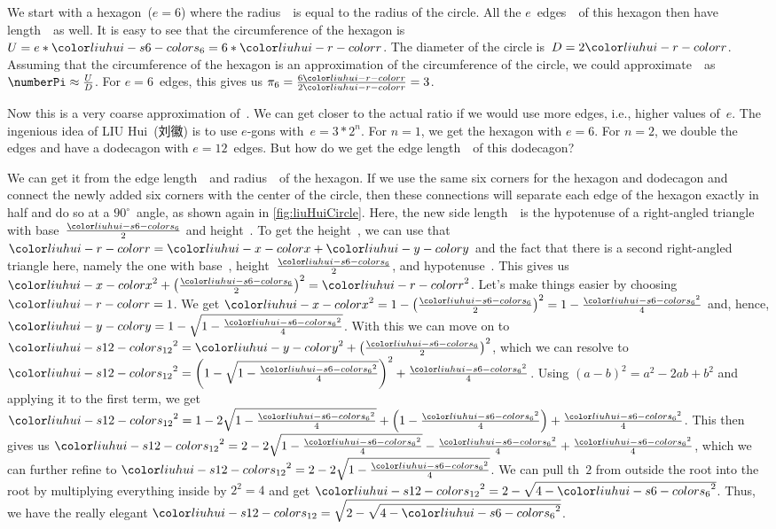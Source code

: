 We start with a hexagon~($e=6$) where the radius~\liuhuir\ is equal to the radius of the circle.
All the $e$~edges~\liuhuiss\ of this hexagon then have length~\liuhuir\ as well.
It is easy to see that the circumference of the hexagon is~$U=e*\liuhuiss=6*\liuhuir$.
The diameter of the circle is~$D=2\liuhuir$.
Assuming that the circumference of the hexagon is an approximation of the circumference of the circle, we could approximate~\numberPi\ as $\numberPi\approx\frac{U}{D}$.
For $e=6$~edges, this gives us $\pi_6=\frac{6\liuhuir}{2\liuhuir}=3$.

Now this is a very coarse approximation of~\numberPi.
We can get closer to the actual ratio if we would use more edges, i.e., higher values of~$e$.
The ingenious idea of LIU Hui~(刘徽) is to use $e$\nobreakdashes-gons with~$e=3*2^n$.
For $n=1$, we get the hexagon with $e=6$.
For $n=2$, we double the edges and have a dodecagon with $e=12$~edges.
But how do we get the edge length~\liuhuist\ of this dodecagon?

We can get it from the edge length~\liuhuiss\ and radius~\liuhuir\ of the hexagon.
If we use the same six corners for the hexagon and dodecagon and connect the newly added six corners with the center of the circle, then these connections will separate each edge of the hexagon exactly in half and do so at a $90^\circ$~angle, as shown again in \cref{fig:liuHuiCircle}.
Here, the new side length~\liuhuist\ is the hypotenuse of a right-angled triangle with base~$\frac{\liuhuiss}{2}$ and height~\liuhuiy.
To get the height~\liuhuiy, we can use that~$\liuhuir=\liuhuix+\liuhuiy$ and the fact that there is a second right-angled triangle here, namely the one with base~\liuhuix, height~$\frac{\liuhuiss}{2}$, and hypotenuse~\liuhuir.
This gives us $\liuhuix^2+\left(\frac{\liuhuiss}{2}\right)^2=\liuhuir^2$.
Let's make things easier by choosing~$\liuhuir=1$.
We get $\liuhuix^2=1-\left(\frac{\liuhuiss}{2}\right)^2=1-\frac{\liuhuiss^2}{4}$ and, hence, $\liuhuiy=1-\sqrt{1-\frac{\liuhuiss^2}{4}}$.
With this we can move on to $\liuhuist^2=\liuhuiy^2+\left(\frac{\liuhuiss}{2}\right)^2$, which we can resolve to $\liuhuist^2=\left(1-\sqrt{1-\frac{\liuhuiss^2}{4}}\right)^2+\frac{\liuhuiss^2}{4}$.
Using $(a-b)^2=a^2-2ab+b^2$ and applying it to the first term, we get $\liuhuist^2=1-2\sqrt{1-\frac{\liuhuiss^2}{4}}+\left(1-\frac{\liuhuiss^2}{4}\right)+\frac{\liuhuiss^2}{4}$.
This then gives us $\liuhuist^2=2-2\sqrt{1-\frac{\liuhuiss^2}{4}}-\frac{\liuhuiss^2}{4}+\frac{\liuhuiss^2}{4}$, which we can further refine to $\liuhuist^2=2-2\sqrt{1-\frac{\liuhuiss^2}{4}}$.
We can pull th~$2$ from outside the root into the root by multiplying everything inside by $2^2=4$ and get $\liuhuist^2=2-\sqrt{4-\liuhuiss^2}$.
Thus, we have the really elegant $\liuhuist=\sqrt{2-\sqrt{4-\liuhuiss^2}}$.


